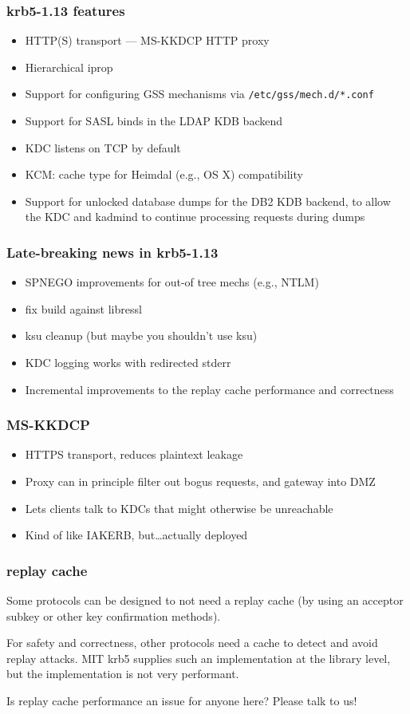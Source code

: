 \documentclass{beamer}
\begin{document}
\begin{frame}[fragile]
\frametitle{krb5-1.13 features}
\begin{itemize}
\item{HTTP(S) transport --- MS-KKDCP HTTP proxy}
\item{Hierarchical iprop}
\item{Support for configuring GSS mechanisms via \verb+/etc/gss/mech.d/*.conf+}
\item{Support for SASL binds in the LDAP KDB backend}
\item{KDC listens on TCP by default}
\item{KCM: cache type for Heimdal (e.g., OS X) compatibility}
\item{Support for unlocked database dumps for the DB2 KDB backend, to allow
	the KDC and kadmind to continue processing requests during dumps}
\end{itemize}
\end{frame}

\begin{frame}
\frametitle{Late-breaking news in krb5-1.13}
\begin{itemize}
\item{SPNEGO improvements for out-of tree mechs (e.g., NTLM)}
\item{fix build against libressl}
\item{ksu cleanup (but maybe you shouldn't use ksu)}
\item{KDC logging works with redirected stderr}
\item{Incremental improvements to the replay cache performance and
	correctness}
\end{itemize}
\end{frame}

\begin{frame}
\frametitle{MS-KKDCP}
\begin{itemize}
\item{HTTPS transport, reduces plaintext leakage}
\item{Proxy can in principle filter out bogus requests, and gateway into DMZ}
\item{Lets clients talk to KDCs that might otherwise be unreachable}
\item{Kind of like IAKERB, but\ldots{}actually deployed}
\end{itemize}
\end{frame}

\begin{frame}
\frametitle{replay cache}
Some protocols can be designed to not need a replay cache (by using
an acceptor subkey or other key confirmation methods).

\vspace{1em}
For safety and correctness, other protocols need a cache to detect and
avoid replay attacks.  MIT krb5 supplies such an implementation at the
library level, but the implementation is not very performant.

\vspace{1em}
Is replay cache performance an issue for anyone here?  Please talk to us!
\end{frame}
\end{document}
